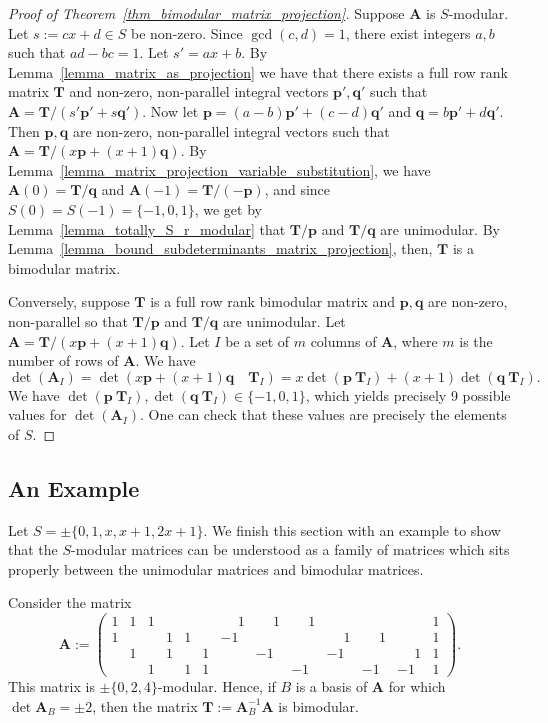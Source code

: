\documentclass[a4paper, 11pt]{article}
\newcommand{\bA}{\bm{A}}
\newcommand{\bp}{\bm{p}}
\newcommand{\bq}{\bm{q}}
\newcommand{\bv}{\bm{v}}
\newcommand{\bu}{\bm{u}}
\newcommand{\bT}{\bm{T}}
\newcommand{\polyS}{S}
\begin{document}



\begin{proof}[Proof of Theorem~\ref{thm_bimodular_matrix_projection}]
 Suppose $\bA$ is $S$-modular. Let $s:=cx+d\in\polyS$ be non-zero. Since $\gcd(c,d)=1$, there exist integers $a,b$ such that $ad-bc=1$. Let $s'=ax+b$. 
 By Lemma~\ref{lemma_matrix_as_projection} we have that there exists a full row rank matrix $\bT$ and non-zero, non-parallel integral vectors $\bp',\bq'$ such that $\bA=\bT/(s'\bp'+s\bq')$. Now let $\bp=(a-b)\bp'+(c-d)\bq'$ and $\bq=b\bp'+d\bq'$. Then $\bp,\bq$ are non-zero, non-parallel integral vectors such that $\bA=\bT/(x\bp + (x+1)\bq)$. By Lemma~\ref{lemma_matrix_projection_variable_substitution}, we have $\bA(0)=\bT/\bq$ and $\bA(-1)=\bT/(-\bp)$, and since $\polyS(0)=\polyS(-1)=\{-1,0,1\}$, we get by Lemma~\ref{lemma_totally_S_r_modular} that $\bT/\bp$ and $\bT/\bq$ are unimodular. By Lemma~\ref{lemma_bound_subdeterminants_matrix_projection}, then, $\bT$ is a bimodular matrix.
 
Conversely, suppose $\bT$ is a full row rank bimodular matrix and $\bp,\bq$ are non-zero, non-parallel so that $\bT/\bp$ and $\bT/\bq$ are unimodular. Let $\bA=\bT/(x\bp+(x+1)\bq)$. Let $I$ be a set of $m$ columns of $\bA$, where $m$ is the number of rows of $\bA$. We have
\[
\det(\bA_I)=\det(x\bp+(x+1)\bq\quad\bT_I)=x\det(\bp\ \bT_I)+(x+1)\det(\bq\ \bT_I).
\]
We have $\det(\bp\ \bT_I),\det(\bq\ \bT_I)\in\{-1,0,1\}$, which yields precisely 9 possible values for $\det(\bA_I)$. One can check that these values are precisely the elements of $S$.
\end{proof}

\subsection{An Example}
Let $\polyS=\pm\{0,1,x,x+1,2x+1\}$. We finish this section with an example to show that the $\polyS$-modular matrices can be understood as a family of matrices which sits properly between the unimodular matrices and bimodular matrices.

Consider the matrix
\[
\bA:=\begin{pmatrix}
1 & 1 & 1 &   &   &   & \phantom{-}1 & \phantom{-}1 & \phantom{-}1 &   &   &   & 1 \\
1 &   &   & 1 & 1 &   & -1 &   &   & \phantom{-}1 & \phantom{-}1 &   & 1 \\
  & 1 &   & 1 &   & 1 &   & -1 &   & -1 &   & \phantom{-}1 & 1 \\
  &   & 1 &   & 1 & 1 &   &   & -1 &   & -1 & -1 & 1
\end{pmatrix}.
\]
This matrix is $\pm\{0,2,4\}$-modular. Hence, if $B$ is a basis of $\bA$ for which $\det\bA_B=\pm 2$, then the matrix $\bT:=\bA_B^{-1}\bA$ is bimodular.
\end{document}
